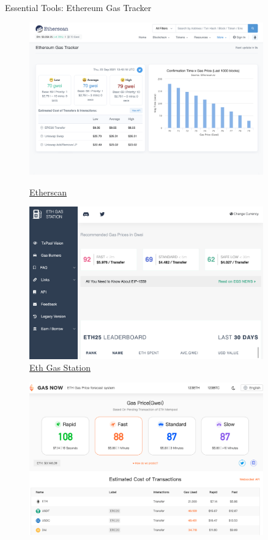 \documentclass[]{beamer}
\begin{document}
\begin{frame}{Essential Tools: Ethereum Gas Tracker}
	\begin{figure}
	\centering
	\begin{minipage}{.45\textwidth}
  		\centering
  		\includegraphics[width=0.9\textwidth]{../assets/images/Etherscan.png}
  		\caption*{\footnotesize \href{https://etherscan.io/}{\link Etherscan}}
	\end{minipage}
	\begin{minipage}{.45\textwidth}
  		\centering
  		\includegraphics[width=0.9\textwidth]{../assets/images/ethGasStation.png}
  		\caption*{\footnotesize \href{https://www.Ethgasstation.info}{\link Eth Gas Station}}
	\end{minipage}
	\end{figure}
	\begin{figure}
		\centering
		\begin{minipage}{0.45\textwidth}
			\includegraphics[width=0.9\textwidth]{../assets/images/gasnow.png}

\end{minipage}
\end{figure}
\end{frame}
\end{document}
